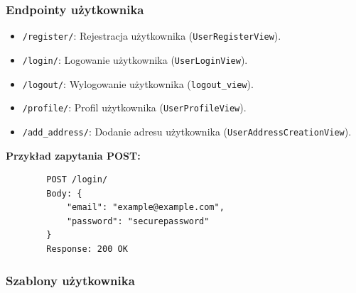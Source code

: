 \documentclass[12pt,a4paper,oneside]{article}
\theoremstyle{definition}
\numberwithin{equation}{section}
\begin{document}
\subsubsection{Endpointy użytkownika}

    \begin{itemize}
        \item \texttt{/register/}: Rejestracja użytkownika (\texttt{UserRegisterView}).
        \item \texttt{/login/}: Logowanie użytkownika (\texttt{UserLoginView}).
        \item \texttt{/logout/}: Wylogowanie użytkownika (\texttt{logout\_view}).
        \item \texttt{/profile/}: Profil użytkownika (\texttt{UserProfileView}).
        \item \texttt{/add\_address/}: Dodanie adresu użytkownika (\texttt{UserAddressCreationView}).
    \end{itemize}

\textbf{Przykład zapytania POST:}
\begin{verbatim}
        POST /login/
        Body: {
            "email": "example@example.com",
            "password": "securepassword"
        }
        Response: 200 OK
\end{verbatim}

\subsubsection{Szablony użytkownika}
\label{sec:login_template}
\end{document}
